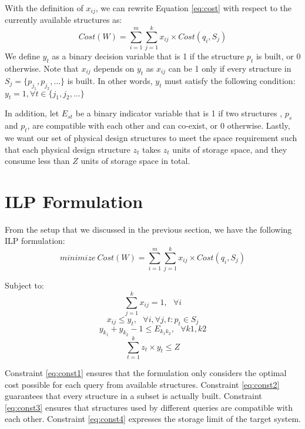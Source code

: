 \documentclass[10pt]{article}
\begin{document}
With the definition of $x_{ij}$, we can rewrite Equation \eqref{eq:cost} with respect to the
currently available structures as:
\begin{equation}
  Cost(W) = \sum_{i=1}^{m} \sum_{j=1}^{k} x_{ij} \times Cost(q_i, S_j)
\end{equation}
We define $y_t$ as a binary decision variable that is 1
if the structure $p_t$ is built, or 0 otherwise.
Note that $x_{ij}$ depends on $y_t$ as $x_{ij}$ can be 1 only if every structure in
$S_j = \{p_{j_1}, p_{j_2}, \dots\}$ is built. In other words, $y_t$ must satisfy the following
condition: $ y_t = 1, \forall t \in \{j_1, j_2, \dots\}$

In addition, let $E_{st}$ be a binary indicator variable that is 1 if two structures
, $p_s$ and $p_t$, are compatible with each other and can co-exist, or 0 otherwise.
Lastly, we want our set of physical design structures to meet the space requirement such that
each physical design structure $z_t$ takes $z_t$ units of storage space, and
they consume less than $Z$ units of storage space in total.

\section{ILP Formulation}
\label{sec:ILP_formulation}

From the setup that we discussed in the previous section, we have the following ILP formulation:
\begin{equation}
  minimize\ Cost(W) = \sum_{i=1}^{m} \sum_{j=1}^{k} x_{ij} \times Cost(q_i, S_j)
  \label{eq:obj}
\end{equation}

Subject to:
\begin{equation}
  \sum_{j=1}^{k} x_{ij} = 1,~~~\forall{i}
  \label{eq:const1}
\end{equation}
\begin{equation}
  x_{ij} \leq  y_{t},~~~\forall{i}, \forall{j,t} : p_t \in S_j
  \label{eq:const2}
\end{equation}
\begin{equation}
  y_{k_1} + y_{k_2} - 1 \leq E_{k_1 k_2},~~~\forall{k1, k2}
  \label{eq:const3}
\end{equation}
\begin{equation}
  \sum_{t=1}^{k} z_t \times y_t \leq Z
  \label{eq:const4}
\end{equation}

Constraint \eqref{eq:const1} ensures that the formulation only considers
the optimal cost possible for each query from available structures.
Constraint \eqref{eq:const2} guarantees that every structure in a subset is actually built.
Constraint \eqref{eq:const3} ensures that structures used by different queries are
compatible with each other.
Constraint \eqref{eq:const4} expresses the storage limit of the target system.
\end{document}
